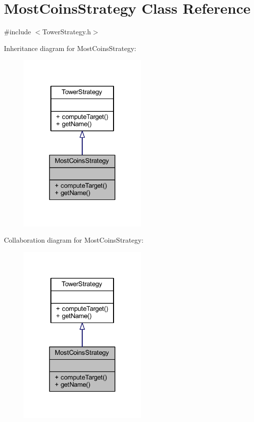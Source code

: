 \hypertarget{class_most_coins_strategy}{\section{Most\+Coins\+Strategy Class Reference}
\label{class_most_coins_strategy}
}


{\ttfamily \#include $<$Tower\+Strategy.\+h$>$}



Inheritance diagram for Most\+Coins\+Strategy\+:\nopagebreak
\begin{figure}[H]
\begin{center}
\leavevmode
\includegraphics[width=180pt]{class_most_coins_strategy__inherit__graph}
\end{center}
\end{figure}


Collaboration diagram for Most\+Coins\+Strategy\+:\nopagebreak
\begin{figure}[H]
\begin{center}
\leavevmode
\includegraphics[width=180pt]{class_most_coins_strategy__coll__graph}
\end{center}
\end{figure}
